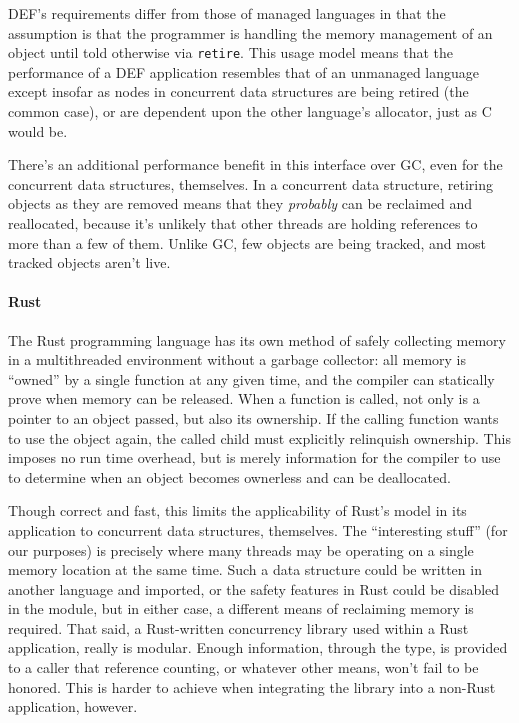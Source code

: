 DEF's requirements differ from those of managed languages in that the assumption is that the programmer is handling the memory management of an object until told otherwise via \texttt{retire}.  This usage model means that the performance of a DEF application resembles that of an unmanaged language except insofar as nodes in concurrent data structures are being retired (the common case), or are dependent upon the other language's allocator, just as C would be.

There's an additional performance benefit in this interface over GC, even for the concurrent data structures, themselves.  In a concurrent data structure, retiring objects as they are removed means that they \textit{probably} can be reclaimed and reallocated, because it's unlikely that other threads are holding references to more than a few of them.  Unlike GC, few objects are being tracked, and most tracked objects aren't live.

\paragraph{Rust} The Rust programming language has its own method of safely collecting memory in a multithreaded environment without a garbage collector: all memory is ``owned'' by a single function at any given time, and the compiler can statically prove when memory can be released.\cite{Rust}  When a function is called, not only is a pointer to an object passed, but also its ownership.  If the calling function wants to use the object again, the called child must explicitly relinquish ownership.  This imposes no run time overhead, but is merely information for the compiler to use to determine when an object becomes ownerless and can be deallocated.

Though correct and fast, this limits the applicability of Rust's model in its application to concurrent data structures, themselves.  The ``interesting stuff'' (for our purposes) is precisely where many threads may be operating on a single memory location at the same time.  Such a data structure could be written in another language and imported, or the safety features in Rust could be disabled in the module, but in either case, a different means of reclaiming memory is required.  That said, a Rust-written concurrency library used within a Rust application, really is modular.  Enough information, through the type, is provided to a caller that reference counting, or whatever other means, won't fail to be honored.  This is harder to achieve when integrating the library into a non-Rust application, however.


